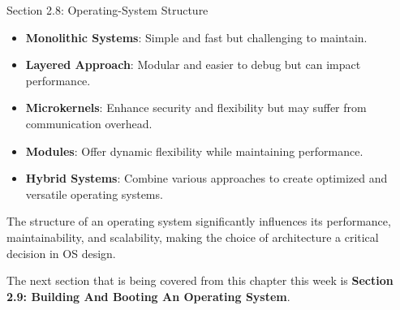 \begin{notes}{Section 2.8: Operating-System Structure}
\begin{highlight}
    \end{highlight}
    
    \begin{highlight}
    
    \begin{itemize}
        \item \textbf{Monolithic Systems}: Simple and fast but challenging to maintain.
        \item \textbf{Layered Approach}: Modular and easier to debug but can impact performance.
        \item \textbf{Microkernels}: Enhance security and flexibility but may suffer from communication overhead.
        \item \textbf{Modules}: Offer dynamic flexibility while maintaining performance.
        \item \textbf{Hybrid Systems}: Combine various approaches to create optimized and versatile operating systems.
    \end{itemize}
    
    The structure of an operating system significantly influences its performance, maintainability, and scalability, making the choice of architecture a critical decision in OS design.
    
    \end{highlight}
\end{notes}

The next section that is being covered from this chapter this week is \textbf{Section 2.9: Building And Booting An Operating System}.

